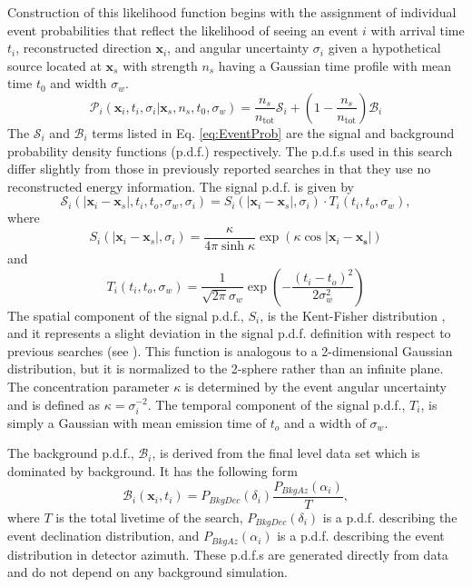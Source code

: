 \documentclass[manuscript]{aastex}
\begin{document}
Construction of this likelihood function begins with the assignment of individual event probabilities that reflect the likelihood of seeing an event $i$ with arrival time $t_i$, reconstructed direction $\mathbf{x}_i$, and angular uncertainty $\sigma_i$ given a hypothetical source located at $\mathbf{x}_s$ with strength $n_s$ having a Gaussian time profile with mean time $t_0$ and width $\sigma_w$.
\begin{equation}\label{eq:EventProb}
\mathcal{P}_i(\mathbf{x}_i,t_i,\sigma_i|\mathbf{x}_s,n_s,t_0,\sigma_w) = \frac{n_s}{n_{\mathrm{tot}}} \mathcal{S}_i + \left(1-\frac{n_s}{n_{\mathrm{tot}}}\right) \mathcal{B}_i
\end{equation}
The $\mathcal{S}_i$ and $\mathcal{B}_i$ terms listed in Eq. \ref{eq:EventProb} are the signal and background probability density functions (p.d.f.) respectively. The p.d.f.s used in this search differ slightly from those in previously reported searches in that they use no reconstructed energy information. The signal p.d.f. is given by
\begin{equation}
\mathcal{S}_i(|\mathbf{x}_i-\mathbf{x}_s|,t_i,t_o,\sigma_w,\sigma_i) = S_i(|\mathbf{x}_i-\mathbf{x}_s|,\sigma_i) \cdot T_i(t_i,t_o,\sigma_w),
\end{equation}
where 
\begin{equation}
S_i(|\mathbf{x}_i-\mathbf{x}_s|,\sigma_i) = \frac{\kappa}{4\pi \sinh \kappa} \exp \left(\kappa \cos |\mathbf{x}_i-\mathbf{x_s}|\right)
\end{equation}
and
\begin{equation}
T_i(t_i,t_o,\sigma_w) = \frac{1}{\sqrt{2\pi}\sigma_w} \exp \left(-\frac{(t_i-t_o)^2}{2 \sigma_w^2}\right)
\end{equation}
The spatial component of the signal p.d.f., $S_i$, is the Kent-Fisher distribution \citep{Fisher_Bingham}, and it represents a slight deviation in the signal p.d.f. definition with respect to previous searches (see \cite{2014ApJ...796..109A}). This function is analogous to a 2-dimensional Gaussian distribution, but it is normalized to the 2-sphere rather than an infinite plane. The concentration parameter $\kappa$ is determined by the event angular uncertainty and is defined as $\kappa = \sigma_{i}^{-2}$. The temporal component of the signal p.d.f., $T_i$, is simply a Gaussian with mean emission time of $t_o$ and a width of $\sigma_w$.

The background p.d.f., $\mathcal{B}_i$, is derived from the final level data set which is dominated by background. It has the following form
\begin{equation}
\mathcal{B}_i(\mathbf{x}_i,t_i) = P_{BkgDec}(\delta_i)\frac{P_{BkgAz}(\alpha_i)}{T},
\end{equation}
where $T$ is the total livetime of the search, $P_{BkgDec}(\delta_i)$ is a p.d.f. describing the event declination distribution, and $P_{BkgAz}(\alpha_i)$ is a p.d.f. describing the event distribution in detector azimuth. These p.d.f.s are generated directly from data and do not depend on any background simulation.
\end{document}
